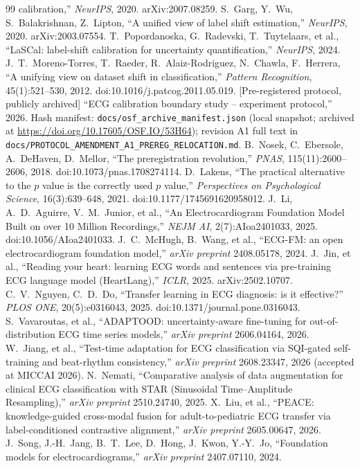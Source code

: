 \documentclass[review,12pt,nonatbib]{elsarticle}
\begin{document}
\begin{thebibliography}{99}
calibration,'' \emph{NeurIPS}, 2020. arXiv:2007.08259.
 S.~Garg, Y.~Wu, S.~Balakrishnan, Z.~Lipton,
``A unified view of label shift estimation,'' \emph{NeurIPS}, 2020.
arXiv:2003.07554.
 T.~Popordanoska, G.~Radevski, T.~Tuytelaars, et al.,
``LaSCal: label-shift calibration for uncertainty quantification,''
\emph{NeurIPS}, 2024.
 J.~T.~Moreno-Torres, T.~Raeder,
R.~Alaiz-Rodriguez, N.~Chawla, F.~Herrera, ``A unifying view on
dataset shift in classification,'' \emph{Pattern Recognition},
45(1):521--530, 2012. doi:10.1016/j.patcog.2011.05.019.
 [Pre-registered protocol, publicly archived] ``ECG
calibration boundary study -- experiment protocol,'' 2026. Hash manifest:
\texttt{docs/osf\_archive\_manifest.json} (local snapshot; archived at
\url{https://doi.org/10.17605/OSF.IO/53H64}); revision A1 full text in
\texttt{docs/PROTOCOL\_AMENDMENT\_A1\_PREREG\_RELOCATION.md}.
 B.~Nosek, C.~Ebersole, A.~DeHaven,
D.~Mellor, ``The preregistration revolution,'' \emph{PNAS},
115(11):2600--2606, 2018. doi:10.1073/pnas.1708274114.
 D.~Lakens, ``The practical alternative to
the $p$ value is the correctly used $p$ value,''
\emph{Perspectives on Psychological Science}, 16(3):639--648, 2021.
doi:10.1177/1745691620958012.
 J.~Li, A.~D.~Aguirre, V.~M.~Junior, et al.,
``An Electrocardiogram Foundation Model Built on over 10 Million
Recordings,'' \emph{NEJM AI},
2(7):AIoa2401033, 2025. doi:10.1056/AIoa2401033.
 J.~C.~McHugh, B.~Wang, et al., ``ECG-FM: an open
electrocardiogram foundation model,'' \emph{arXiv preprint}
2408.05178, 2024.
 J.~Jin, et al., ``Reading your heart: learning
ECG words and sentences via pre-training ECG language model
(HeartLang),'' \emph{ICLR}, 2025. arXiv:2502.10707.
 C.~V.~Nguyen, C.~D.~Do, ``Transfer learning in ECG
diagnosis: is it effective?'' \emph{PLOS ONE}, 20(5):e0316043, 2025.
doi:10.1371/journal.pone.0316043.
 S.~Vavaroutas, et al., ``ADAPTOOD:
uncertainty-aware fine-tuning for out-of-distribution ECG time series
models,'' \emph{arXiv preprint} 2606.04164, 2026.
 W.~Jiang, et al., ``Test-time adaptation for ECG
classification via SQI-gated self-training and beat-rhythm
consistency,'' \emph{arXiv preprint} 2608.23347, 2026 (accepted at
MICCAI 2026).
 N.~Nemati, ``Comparative analysis of data
augmentation for clinical ECG classification with STAR (Sinusoidal
Time--Amplitude Resampling),'' \emph{arXiv preprint} 2510.24740, 2025.
 X.~Liu, et al., ``PEACE: knowledge-guided
cross-modal fusion for adult-to-pediatric ECG transfer via
label-conditioned contrastive alignment,'' \emph{arXiv preprint}
2605.00647, 2026.
 J.~Song, J.-H.~Jang, B.~T.~Lee, D.~Hong,
J.~Kwon, Y.-Y.~Jo, ``Foundation models for electrocardiograms,''
\emph{arXiv preprint} 2407.07110, 2024.
\end{thebibliography}
\end{document}
